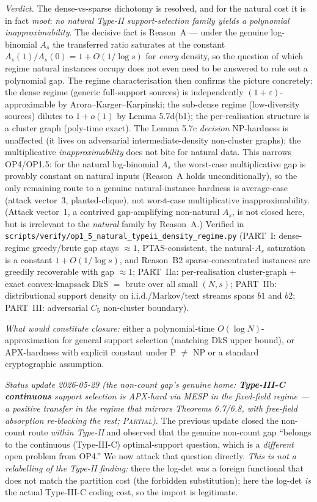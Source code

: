 \documentclass[
]{article}
\begin{document}
\emph{Verdict.} The dense-vs-sparse dichotomy is resolved, and for the
natural cost it is in fact \emph{moot}: \emph{no natural Type-II
support-selection family yields a polynomial inapproximability}. The decisive
fact is Reason~A --- under the genuine log-binomial $A_s$ the transferred
ratio saturates at the constant $A_s(1)/A_s(0) = 1 + O(1/\log s)$ for
\emph{every} density, so the question of which regime natural instances
occupy does not even need to be answered to rule out a polynomial gap. The
regime characterisation then confirms the picture concretely: the dense
regime (generic full-support sources) is independently
$(1+\varepsilon)$-approximable by Arora--Karger--Karpinski; the sub-dense
regime (low-diversity sources) dilutes to $1 + o(1)$ by Lemma 5.7d(b1); the
per-realisation structure is a cluster graph (poly-time exact). The Lemma
5.7c \emph{decision} NP-hardness is unaffected (it lives on adversarial
intermediate-density non-cluster graphs); the multiplicative
\emph{inapproximability} does not bite for natural data. This narrows
OP4/OP1.5: for the natural log-binomial $A_s$ the worst-case multiplicative
gap is provably constant on natural inputs (Reason~A holds unconditionally),
so the only remaining route to a genuine natural-instance hardness is
average-case (attack vector~3, planted-clique), not worst-case multiplicative
inapproximability. (Attack vector~1, a contrived gap-amplifying non-natural
$A_s$, is not closed here, but is irrelevant to the \emph{natural} family by
Reason~A.) Verified in
\texttt{scripts/verify/op1\_5\_natural\_typeii\_density\_regime.py} (PART~I:
dense-regime greedy/brute gap stays $\approx 1$, PTAS-consistent, the
natural-$A_s$ saturation is a constant $1 + O(1/\log s)$, and Reason~B2
sparse-concentrated instances are greedily recoverable with gap $\approx 1$;
PART~IIa: per-realisation cluster-graph + exact convex-knapsack DkS $=$ brute
over all small $(N,s)$; PART~IIb: distributional support density on
i.i.d./Markov/text streams spans $b1$ and $b2$; PART~III: adversarial $C_5$
non-cluster boundary).

\emph{What would constitute closure:} either a polynomial-time
$O(\log N)$-approximation for general support selection (matching
DkS upper bound), or APX-hardness with explicit constant under
P $\neq$ NP or a standard cryptographic assumption.

\emph{Status update 2026-05-29 (the non-count gap's genuine home:
\textbf{Type-III-C continuous} support selection \emph{is} APX-hard via
MESP in the fixed-field regime --- a positive transfer in the regime that
mirrors Theorems 6.7/6.8, with free-field absorption re-blocking the rest;
\textsc{Partial}).} The previous update closed the non-count route
\emph{within Type-II} and observed that the genuine non-count gap
``belongs to the continuous (Type-III-C) optimal-support question, which is
a \emph{different} open problem from OP4.'' We now attack that question
directly. \emph{This is not a relabelling of the Type-II finding:} there
the log-det was a foreign functional that does not match the partition cost
(the forbidden substitution); here the log-det \emph{is} the actual
Type-III-C coding cost, so the import is legitimate.
\end{document}
